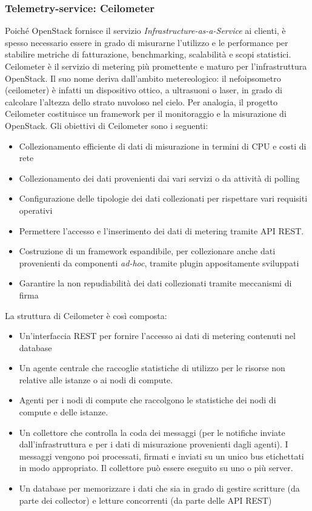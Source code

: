 \documentclass[../main.tex]{subfiles}
\begin{document}
\subsubsection{Telemetry-service: Ceilometer}
Poiché OpenStack fornisce il servizio \textit{Infrastructure-as-a-Service} ai clienti, è spesso necessario essere in grado di misurarne l'utilizzo e le performance per stabilire metriche di fatturazione, benchmarking, scalabilità e scopi statistici.
Ceilometer è il servizio di metering più promettente e maturo per l'infrastruttura OpenStack. 
Il suo nome deriva dall'ambito metereologico: il nefoipsometro (ceilometer) è infatti un dispositivo ottico, a ultrasuoni o laser, in grado di calcolare l'altezza dello strato nuvoloso nel cielo.
Per analogia, il progetto Ceilometer costituisce un framework per il monitoraggio e la misurazione di OpenStack.
Gli obiettivi di Ceilometer sono i seguenti:
\begin{itemize}
\item Collezionamento efficiente di dati di misurazione in termini di CPU e costi di rete
\item Collezionamento dei dati provenienti dai vari servizi o da attività  di polling
\item Configurazione delle tipologie dei dati collezionati per rispettare vari requisiti operativi
\item Permettere l'accesso e l'inserimento dei dati di metering tramite API REST.
\item Costruzione di un framework espandibile, per collezionare anche dati provenienti da componenti \textit{ad-hoc}, tramite plugin appositamente sviluppati
\item Garantire la non repudiabilità dei dati collezionati tramite meccanismi di firma
\end{itemize}
La struttura di Ceilometer è così composta:
\begin{itemize}
\item Un'interfaccia REST per fornire l'accesso ai dati di metering contenuti nel database
\item Un agente centrale che raccoglie statistiche di utilizzo per le risorse non relative alle istanze o ai nodi di compute.
\item Agenti per i nodi di compute che raccolgono le statistiche dei nodi di compute e delle istanze.
\item Un collettore che controlla la coda dei messaggi (per le notifiche inviate dall'infrastruttura e per i dati di misurazione provenienti dagli agenti).  I messaggi vengono poi processati, firmati e inviati su un unico bus etichettati in modo appropriato. Il collettore può essere eseguito su uno o più server.
\item Un database per memorizzare i dati che sia in grado di gestire scritture (da parte dei collector) e letture concorrenti (da parte delle API REST)
\end{itemize}
\end{document}
